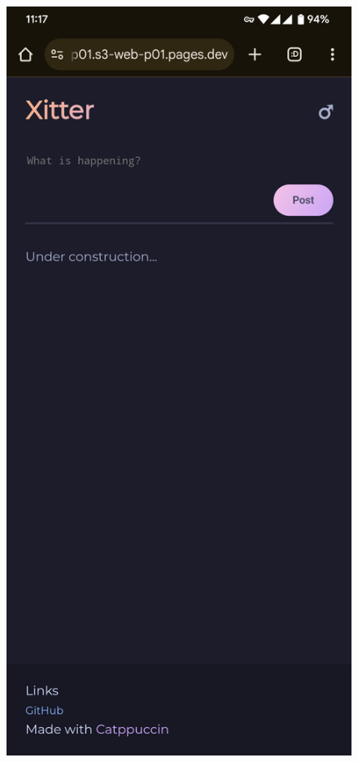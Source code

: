 \begin{figure}[!ht]
    \centering
    \includegraphics[height=\textheight,keepaspectratio,width=\textwidth]{../assets/Screenshot_20241125-231705_Chrome.png}
\end{figure}
